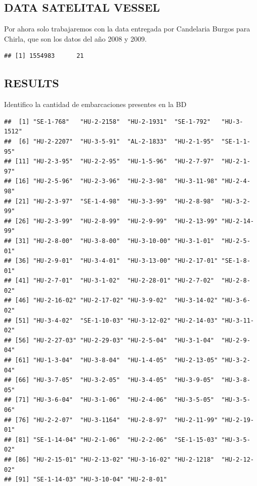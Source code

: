 \documentclass[
]{article}
\newenvironment{Shaded}{\begin{snugshade}}{\end{snugshade}}
\newcommand{\FunctionTok}[1]{\textcolor[rgb]{0.13,0.29,0.53}{\textbf{#1}}}
\newcommand{\NormalTok}[1]{#1}
\newcommand{\SpecialCharTok}[1]{\textcolor[rgb]{0.81,0.36,0.00}{\textbf{#1}}}
\begin{document}
\hypertarget{data-satelital-vessel}{%
\subsection{DATA SATELITAL VESSEL}\label{data-satelital-vessel}}

Por ahora solo trabajaremos con la data entregada por Candelaria Burgos para Chirla, que son los datos del año 2008 y 2009.

\begin{verbatim}
## [1] 1554983      21
\end{verbatim}

\hypertarget{results}{%
\subsection{RESULTS}\label{results}}

Identifico la cantidad de embarcaciones presentes en la BD

\begin{Shaded}
\end{Shaded}

\begin{verbatim}
##  [1] "SE-1-768"   "HU-2-2158"  "HU-2-1931"  "SE-1-792"   "HU-3-1512" 
##  [6] "HU-2-2207"  "HU-3-5-91"  "AL-2-1833"  "HU-2-1-95"  "SE-1-1-95" 
## [11] "HU-2-3-95"  "HU-2-2-95"  "HU-1-5-96"  "HU-2-7-97"  "HU-2-1-97" 
## [16] "HU-2-5-96"  "HU-2-3-96"  "HU-2-3-98"  "HU-3-11-98" "HU-2-4-98" 
## [21] "HU-2-3-97"  "SE-1-4-98"  "HU-3-3-99"  "HU-2-8-98"  "HU-3-2-99" 
## [26] "HU-2-3-99"  "HU-2-8-99"  "HU-2-9-99"  "HU-2-13-99" "HU-2-14-99"
## [31] "HU-2-8-00"  "HU-3-8-00"  "HU-3-10-00" "HU-3-1-01"  "HU-2-5-01" 
## [36] "HU-2-9-01"  "HU-3-4-01"  "HU-3-13-00" "HU-2-17-01" "SE-1-8-01" 
## [41] "HU-2-7-01"  "HU-3-1-02"  "HU-2-28-01" "HU-2-7-02"  "HU-2-8-02" 
## [46] "HU-2-16-02" "HU-2-17-02" "HU-3-9-02"  "HU-3-14-02" "HU-3-6-02" 
## [51] "HU-3-4-02"  "SE-1-10-03" "HU-3-12-02" "HU-2-14-03" "HU-3-11-02"
## [56] "HU-2-27-03" "HU-2-29-03" "HU-2-5-04"  "HU-3-1-04"  "HU-2-9-04" 
## [61] "HU-1-3-04"  "HU-3-8-04"  "HU-1-4-05"  "HU-2-13-05" "HU-3-2-04" 
## [66] "HU-3-7-05"  "HU-3-2-05"  "HU-3-4-05"  "HU-3-9-05"  "HU-3-8-05" 
## [71] "HU-3-6-04"  "HU-3-1-06"  "HU-2-4-06"  "HU-3-5-05"  "HU-3-5-06" 
## [76] "HU-2-2-07"  "HU-3-1164"  "HU-2-8-97"  "HU-2-11-99" "HU-2-19-01"
## [81] "SE-1-14-04" "HU-2-1-06"  "HU-2-2-06"  "SE-1-15-03" "HU-3-5-02" 
## [86] "HU-2-15-01" "HU-2-13-02" "HU-3-16-02" "HU-2-1218"  "HU-2-12-02"
## [91] "SE-1-14-03" "HU-3-10-04" "HU-2-8-01"
\end{verbatim}
\end{document}
